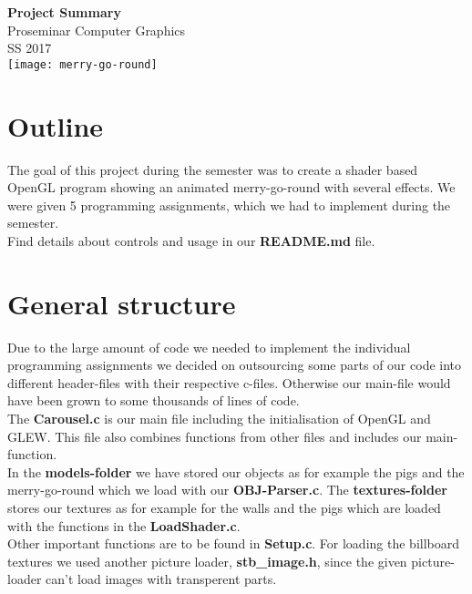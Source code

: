\documentclass[a4paper, 12pt]{article}
\begin{document}
	\begin{titlepage}
		\begin{center}
			\LARGE\textbf{Project Summary}\\
			
			\large{Proseminar Computer Graphics}\\
			\large{SS 2017}\\
			\vspace{2cm}
			\texttt{[image: merry-go-round]}	
		\end{center}
	\end{titlepage}

\section{Outline}
The goal of this project during the semester was to create a shader based OpenGL program showing an animated merry-go-round with several effects. We were given 5 programming assignments, which we had to implement during the semester.
\\
Find details about controls and usage in our \textbf{README.md} file.

\section{General structure}
Due to the large amount of code we needed to implement the individual programming assignments we decided on outsourcing some parts of our code into different header-files with their respective c-files. Otherwise our main-file would have been grown to some thousands of lines of code.\\
The \textbf{Carousel.c} is our main file including the initialisation of OpenGL and GLEW. This file also combines functions from other files and includes our main-function.\\
In the \textbf{models-folder} we have stored our objects as for example the pigs and the merry-go-round which we load with our \textbf{OBJ-Parser.c}. The \textbf{textures-folder} stores our textures as for example for the walls and the pigs which are loaded with the functions in the \textbf{LoadShader.c}.\\
Other important functions are to be found in \textbf{Setup.c}. For loading the billboard textures we used another picture loader, \textbf{stb\_image.h}, since the given picture-loader can't load images with transperent parts.\\
\end{document}
